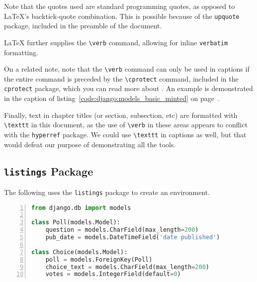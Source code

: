 Note that the quotes used are standard programming quotes, as opposed to \LaTeX 's backtick-quote combination. This is possible because of the \verb|upquote| package, included in the preamble of the document.

\LaTeX{} further supplies the \verb|\verb| command, allowing for inline \verb|verbatim| formatting.

On a related note, note that the \verb|\verb| command can only be used in captions if the entire command is preceded by the \verb|\cprotect| command, included in the \verb|cprotect| package, which you can read more about . An example is demonstrated in the caption of listing~\ref{code:django:models_basic_minted} on page~\pageref{code:django:models_basic_minted}.

Finally, text in chapter titles (or section, subsection, etc) are formatted with \verb|\texttt| in this document, as the use of \verb|\verb| in these areas appears to conflict with the \verb|hyperref| package. We could use \verb|\texttt| in captions as well, but that would defeat our purpose of demonstrating all the tools.

\subsection{\texttt{listings} Package}

The following uses the \verb|listings| package to create an environment.

\noindent\minipage{\linewidth} %
\begin{lstlisting}[aboveskip=\baselineskip,%
                   basicstyle=\ttfamily,%
                   belowskip=\baselineskip,%
                   caption={\lstinline{models.py} from Django Tutorial},%
                   columns=fixed,%
                   firstnumber=1,%
                   frame=single,%
                   label=code:django:models_basic_listing,%
                   language=Python,%
                   numbers=left,%
                   showstringspaces=false,%
                   showspaces=false]
from django.db import models

class Poll(models.Model):
    question = models.CharField(max_length=200)
    pub_date = models.DateTimeField('date published')

class Choice(models.Model):
    poll = models.ForeignKey(Poll)
    choice_text = models.CharField(max_length=200)
    votes = models.IntegerField(default=0)
\end{lstlisting}
\endminipage %

